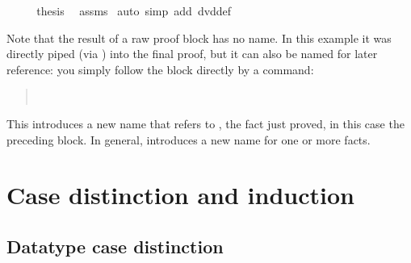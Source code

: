 \begin{isabellebody}
\isanewline
\ \ \isamarkupfalse%
\ \isamarkupfalse%
\ {}thesis\ \isamarkupfalse%
\ assms\ \isamarkupfalse%
{}auto\ simp\ add{}\ dvd{}def{}\isanewline
{}\isamarkupfalse%
%
\endisatagproof
{\isafoldproof}%
%
\isadelimproof
%
\endisadelimproof
%
\begin{isamarkuptext}%
Note that the result of a raw proof block has no name. In this example
it was directly piped (via ) into the final proof, but it can
also be named for later reference: you simply follow the block directly by a
 command:
\begin{quote}
 \ 
\end{quote}
This introduces a new name  that refers to ,
the fact just proved, in this case the preceding block. In general,
 introduces a new name for one or more facts.

\section{Case distinction and induction}

\subsection{Datatype case distinction}


\end{isamarkuptext}
\end{isabellebody}
